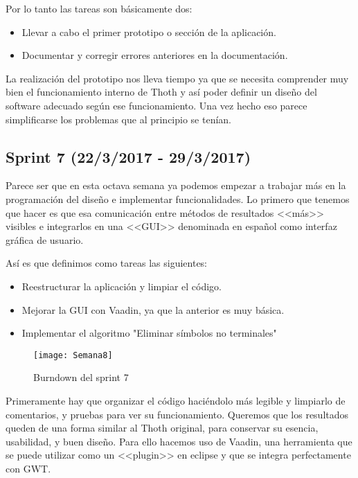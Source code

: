 Por lo tanto las tareas son básicamente dos:

\begin{itemize}
\item Llevar a cabo el primer prototipo o sección de la aplicación.
\item Documentar y corregir errores anteriores en la documentación.
\end{itemize}

La realización del prototipo nos lleva tiempo ya que se necesita comprender muy bien el funcionamiento interno de Thoth y así poder definir un diseño del software adecuado según ese funcionamiento. Una vez hecho eso parece simplificarse los problemas que al principio se tenían.

\subsection{Sprint 7 (22/3/2017 - 29/3/2017)}

Parece ser que en esta octava semana ya podemos empezar a trabajar más en la programación del diseño e implementar funcionalidades. Lo primero que tenemos que hacer es que esa comunicación entre métodos de resultados <<más>> visibles e integrarlos en una <<GUI>> denominada en español como interfaz gráfica de usuario. 

Así es que definimos como tareas las siguientes:

\begin{itemize}
\item Reestructurar la aplicación y limpiar el código.
\item Mejorar la GUI con Vaadin, ya que la anterior es muy básica.
\item Implementar el algoritmo "Eliminar símbolos no terminales"
\end{itemize}

\begin{figure}[h]
\centering
\texttt{[image: Semana8]}
\caption{Burndown del sprint 7}
\label{fig:A.6}
\end{figure}

Primeramente hay que organizar el código haciéndolo más legible y limpiarlo de comentarios, y pruebas para ver su funcionamiento. Queremos que los resultados queden de una forma similar al Thoth original, para conservar su esencia, usabilidad, y buen diseño. Para ello hacemos uso de Vaadin, una herramienta que se puede utilizar como un <<plugin>> en eclipse y que se integra perfectamente con GWT.

